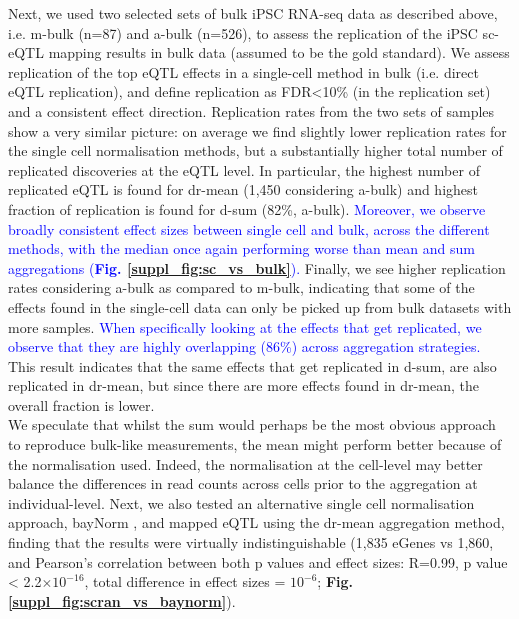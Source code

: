 Next, we used two selected sets of bulk iPSC RNA-seq data as described above, i.e. m-bulk (n=87) and a-bulk (n=526), to assess the replication of the iPSC sc-eQTL mapping results in bulk data (assumed to be the gold standard). 
We assess replication of the top eQTL effects in a single-cell method in bulk (i.e. direct eQTL replication), and define replication as FDR<10\% (in the replication set) and a consistent effect direction. 
Replication rates from the two sets of samples show a very similar picture: on average we find slightly lower replication rates for the single cell normalisation methods, but a substantially higher total number of replicated discoveries at the eQTL level. 
In particular, the highest number of replicated eQTL is found for dr-mean (1,450 considering a-bulk) and highest fraction of replication is found for d-sum (82\%, a-bulk).
\textcolor{blue}{Moreover, we observe broadly consistent effect sizes between single cell and bulk, across the different methods, with the median once again performing worse than mean and sum aggregations (\textbf{Fig. \ref{suppl_fig:sc_vs_bulk}}).}
Finally, we see higher replication rates considering a-bulk as compared to m-bulk, indicating that some of the effects found in the single-cell data can only be picked up from bulk datasets with more samples.
\textcolor{blue}{When specifically looking at the effects that get replicated, we observe that they are highly overlapping (86\%) across aggregation strategies. }
This result indicates that the same effects that get replicated in d-sum, are also replicated in dr-mean, but since there are more effects found in dr-mean, the overall fraction is lower. \\

We speculate that whilst the sum would perhaps be the most obvious approach to reproduce bulk-like measurements, the mean might perform better because of the normalisation used.
Indeed, the normalisation at the cell-level may better balance the differences in read counts across cells prior to the aggregation at individual-level. 
Next, we also tested an alternative single cell normalisation approach, bayNorm \cite{tang2020baynorm}, and mapped eQTL using the dr-mean aggregation method, finding that the results were virtually indistinguishable (1,835 eGenes vs 1,860, and Pearson's correlation between both p values and effect sizes: R=0.99, p value < 2.2$\times 10^{-16}$, total difference in effect sizes = $10^{-6}$; \textbf{Fig. \ref{suppl_fig:scran_vs_baynorm}}). 
\\

